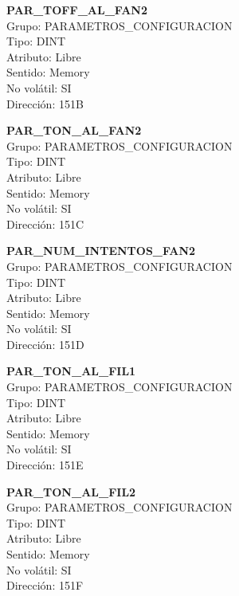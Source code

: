 \vspace{10mm}

\textbf{PAR\_TOFF\_AL\_FAN2}\\Grupo: PARAMETROS\_CONFIGURACION\\Tipo: DINT\\Atributo: Libre\\Sentido: Memory\\No volátil: SI\\Dirección: 151B

\vspace{10mm}

\textbf{PAR\_TON\_AL\_FAN2}\\Grupo: PARAMETROS\_CONFIGURACION\\Tipo: DINT\\Atributo: Libre\\Sentido: Memory\\No volátil: SI\\Dirección: 151C

\vspace{10mm}

\textbf{PAR\_NUM\_INTENTOS\_FAN2}\\Grupo: PARAMETROS\_CONFIGURACION\\Tipo: DINT\\Atributo: Libre\\Sentido: Memory\\No volátil: SI\\Dirección: 151D

\vspace{10mm}

\textbf{PAR\_TON\_AL\_FIL1}\\Grupo: PARAMETROS\_CONFIGURACION\\Tipo: DINT\\Atributo: Libre\\Sentido: Memory\\No volátil: SI\\Dirección: 151E

\vspace{10mm}

\textbf{PAR\_TON\_AL\_FIL2}\\Grupo: PARAMETROS\_CONFIGURACION\\Tipo: DINT\\Atributo: Libre\\Sentido: Memory\\No volátil: SI\\Dirección: 151F

\vspace{10mm}

